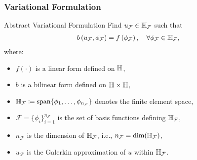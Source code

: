 \begin{frame}
\frametitle{Variational Formulation}
    \begin{block}{Abstract Variational Formulation}
        Find $u_{\mathcal{F}} \in \mathbb{H}_{\mathcal{F}}$ such that
        \begin{align}
        \label{eq:directH1}
            b\left(u_{\mathcal{F}},\phi_{\mathcal{F}}\right) = f\left(\phi_{\mathcal{F}}\right), \quad \forall \phi_{\mathcal{F}} \in \mathbb{H}_{\mathcal{F}},
        \end{align}
        where:
        \begin{itemize}
            \item $f(\cdot)$ is a linear form defined on $\mathbb{H}$,
            \item $b$ is a bilinear form defined on $\mathbb{H} \times \mathbb{H}$,
            \item $\mathbb{H}_{\mathcal{F}} \coloneqq \textrm{span}\{\phi_{1}, \dots, \phi_{n_{\mathcal{F}}}\}$ denotes the finite element space,
            \item $\mathcal{F} = \{\phi_{i}\}_{i=1}^{n_{\mathcal{F}}}$ is the set of basis functions defining $\mathbb{H}_{\mathcal{F}}$,
            \item $n_{\mathcal{F}}$ is the dimension of $\mathbb{H}_{\mathcal{F}}$, i.e., $n_{\mathcal{F}} = \textrm{dim}(\mathbb{H}_{\mathcal{F}})$,
            \item $u_{\mathcal{F}}$ is the Galerkin approximation of $u$ within $\mathbb{H}_{\mathcal{F}}$.
        \end{itemize}
    \end{block}     
\end{frame}

